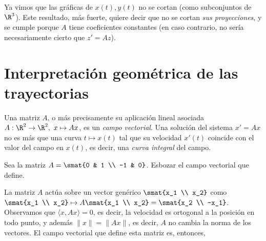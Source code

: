 \documentclass[../main.tex]{subfiles}
\begin{document}
\begin{remark}
  Ya vimos que las gráficas de \(x(t), y(t)\) no se cortan (como subconjuntos de
  \(\R^3\)). Este resultado, más fuerte, quiere decir que no se cortan \emph{sus
    proyecciones}, y se cumple porque \(A\) tiene coeficientes constantes (en
  caso contrario, no sería necesariamente cierto que \(z' = Az\)).
\end{remark}

\section{Interpretación geométrica de las trayectorias}

Una matriz \(A\), o más precisamente su aplicación lineal asociada \(A : \R^2
\to \R^2,\ x \mapsto Ax\), es un \emph{campo vectorial}. Una solución del
sistema \(x' = Ax\) no es más que una curva \(t \mapsto x(t)\) tal que su
velocidad \(x'(t)\) coincide con el valor del campo en \(x(t)\), es decir, una
\emph{curva integral} del campo.

\begin{example}
  Sea la matriz \(A = \smat{0 & 1 \\ -1 & 0}\). Esbozar el campo vectorial que
  define.

  La matriz \(A\) actúa sobre un vector genérico \(\smat{x_1 \\ x_2}\) como
  \(\smat{x_1 \\ x_2} \mapsto A\smat{x_1 \\ x_2} = \smat{x_2 \\ -x_1}\).
  Observamos que \(\langle x, Ax \rangle = 0\), es decir, la velocidad es
  ortogonal a la posición en todo punto, y además \(\|x\| = \|Ax\|\), es decir,
  \(A\) no cambia la norma de los vectores. El campo vectorial que define esta
  matriz es, entonces,

  \begin{figure}[ht]
    \centering
  \end{figure}
\end{example}
\end{document}
